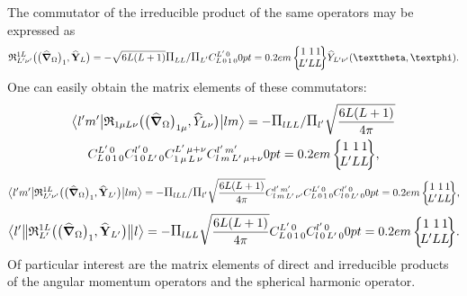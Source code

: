 The commutator of the irreducible product of the same operators may be expressed as
\begin{equation}
\mathfrak{R}_{L^{\prime} \nu^{\prime}}^{1 L}\bigl(\bigl(\delop_{\Omega}\bigr)_{1}, \widehat{\vect{Y}}_{L}\bigr)=-\sqrt{6 L(L+1)}\Fact{L L}/\Fact{L^\prime} 
\clebsch{L}{0}{1}{0}{L^{\prime}}{0}
\sixj{1}{1}{1}{L^{\prime}}{L}{L} 
\widehat{Y}_{L^{\prime} \nu^{\prime}}(\vartheta, \varphi). \label{eq:13:2:113}
\end{equation}
One can easily obtain the matrix elements of these commutators:
\begin{multline}
\braOket{ l^{\prime} m^{\prime}}{ \mathfrak{R}_{1 \mu L \nu}\bigl(\bigl(\delop_{\Omega}\bigr)_{1 \mu}, \widehat{Y}_{L \nu}\bigr)}{l m}=-\Fact{l L L}/\Fact{l^\prime}\sqrt{\frac{6 L(L+1)}{4 \pi}} \\
\clebsch{L}{0}{1}{0}{L^{\prime}}{0} 
\clebsch{1}{0}{L^{\prime}}{0}{l^{\prime}}{0} 
\clebsch{1}{\mu}{L}{\nu}{L^{\prime}}{\mu+\nu} 
\clebsch{l}{m}{L^{\prime}}{\mu+\nu}{l^{\prime}}{m^{\prime}}
\sixj{1}{1}{1}{L^{\prime}}{L}{L},  \label{eq:13:2:114}
\end{multline}
\begin{equation}
\braOket{ l^{\prime} m^{\prime}}{ \mathfrak{R}_{L^{\prime} \nu^{\prime}}^{1 L}\bigl(\bigl(\delop_{\Omega}\bigr)_{1}, \widehat{\vect{Y}}_{L^{\prime}}\bigr)}{l m}=-\Fact{l L L}/\Fact{l^\prime}\sqrt{\frac{6 L(L+1)}{4 \pi}} 
\clebsch{l}{m}{L^{\prime}}{\nu^{\prime}}{l^{\prime}}{m^{\prime}} 
\clebsch{L}{0}{1}{0}{L^{\prime}}{0} 
\clebsch{l}{0}{L^{\prime}}{0}{l^{\prime}}{0}
\sixj{1}{1}{1}{L^{\prime}}{L}{L} , \label{eq:13:2:115}
\end{equation}
\begin{equation*}
\braOketred{ l^{\prime}}{ \mathfrak{R}_{L^{\prime}}^{1 L}\bigl(\bigl(\delop_{\Omega}\bigr)_{1}, \widehat{\vect{Y}}_{L^{\prime}}\bigr)}{l}=-\Fact{l L L}\sqrt{\frac{6 L(L+1)}{4 \pi}} 
\clebsch{L}{0}{1}{0}{L^{\prime}}{0} 
\clebsch{l}{0}{L^{\prime}}{0}{l^{\prime}}{0}
\sixj{1}{1}{1}{L^{\prime}}{L}{L} .
\end{equation*}
Of particular interest are the matrix elements of direct and irreducible products of the angular momentum operators and the spherical harmonic operator.

